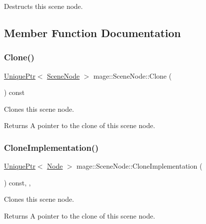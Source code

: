 Destructs this scene node. 

\subsection{Member Function Documentation}
\hypertarget{classmage_1_1_scene_node_ae92f68ce03011b1c1d71421f077a00f8}{}\label{classmage_1_1_scene_node_ae92f68ce03011b1c1d71421f077a00f8} 
\subsubsection{\texorpdfstring{Clone()}{Clone()}}
{\footnotesize\ttfamily \hyperlink{namespacemage_a3316d7143a973e37adf1110f2e80ca31}{Unique\+Ptr}$<$ \hyperlink{classmage_1_1_scene_node}{Scene\+Node} $>$ mage\+::\+Scene\+Node\+::\+Clone (\begin{DoxyParamCaption}{ }\end{DoxyParamCaption}) const}

Clones this scene node.

\begin{DoxyReturn}{Returns}
A pointer to the clone of this scene node. 
\end{DoxyReturn}
\hypertarget{classmage_1_1_scene_node_a42d0d53ab804d38ebd584d2de6490eeb}{}\label{classmage_1_1_scene_node_a42d0d53ab804d38ebd584d2de6490eeb} 
\subsubsection{\texorpdfstring{Clone\+Implementation()}{CloneImplementation()}}
{\footnotesize\ttfamily \hyperlink{namespacemage_a3316d7143a973e37adf1110f2e80ca31}{Unique\+Ptr}$<$ \hyperlink{classmage_1_1_node}{Node} $>$ mage\+::\+Scene\+Node\+::\+Clone\+Implementation (\begin{DoxyParamCaption}{ }\end{DoxyParamCaption}) const\hspace{0.3cm}{\ttfamily [override]}, {\ttfamily [private]}, {\ttfamily [virtual]}}

Clones this scene node.

\begin{DoxyReturn}{Returns}
A pointer to the clone of this scene node. 
\end{DoxyReturn}


